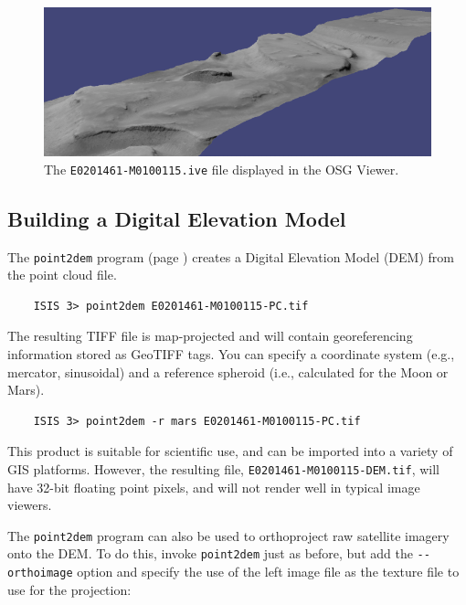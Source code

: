 \begin{figure}[h!]
\begin{minipage}{5in}
\includegraphics[width=5in]{images/p19-osg.png}
\end{minipage}
\hfill
\begin{minipage}{1.7in}
\caption[P19 in OSG]{
    \label{p19-osg}
	The \texttt{E0201461-M0100115.ive} file displayed in the OSG
        Viewer.  }
\end{minipage}
\end{figure}

\subsection{Building a Digital Elevation Model}

The \texttt{point2dem} program (page \pageref{point2dem}) creates a
Digital Elevation Model (\ac{DEM}) from the point cloud file.

\begin{verbatim}
    ISIS 3> point2dem E0201461-M0100115-PC.tif
\end{verbatim}

\noindent
The resulting TIFF file is map-projected and will contain
georeferencing information stored as GeoTIFF tags. You can specify a
coordinate system (e.g., mercator, sinusoidal) and a reference
spheroid (i.e., calculated for the Moon or Mars).

\begin{verbatim}
    ISIS 3> point2dem -r mars E0201461-M0100115-PC.tif
\end{verbatim}

\noindent
This product is suitable for scientific use, and can be imported into
a variety of GIS platforms.  However, the resulting file,
\texttt{E0201461-M0100115-DEM.tif}, will have 32-bit floating point
pixels, and will not render well in typical image viewers.

The \texttt{point2dem} program can also be used to orthoproject raw
satellite imagery onto the \ac{DEM}. To do this, invoke
\texttt{point2dem} just as before, but add the \texttt{-\/-orthoimage}
option and specify the use of the left image file as the texture file
to use for the projection:

